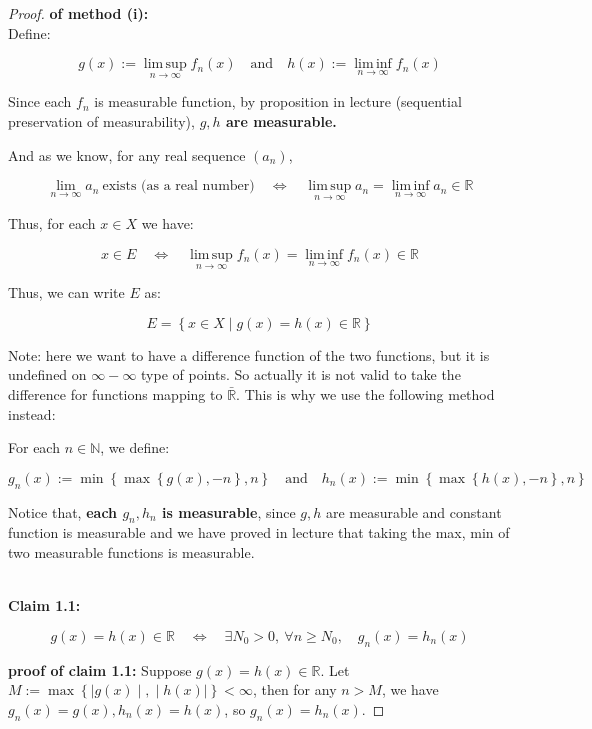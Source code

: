 \documentclass{qlnotes-export}
\begin{document}
\begin{proof}

\textbf{of method (i):}\\
Define:

\[g(x) := \operatorname{lim\, sup}\limits_{n\rightarrow\infty}f_{n}(x)\quad\text{and}\quad h(x) := \operatorname{lim\, inf}\limits_{n\rightarrow\infty}f_{n}(x)\]

Since each \(f_{n}\) is measurable function, by proposition in lecture (sequential preservation of measurability), \textbf{\(g,h\) are measurable.}

And as we know, for any real sequence \((a_{n})\),

\[\lim\limits_{n\rightarrow\infty}a_{n}\ \text{exists (as a real number)}\quad\Leftrightarrow\quad\operatorname{lim\, sup}\limits_{n\rightarrow\infty}a_{n} = \operatorname{lim\, inf}\limits_{n\rightarrow\infty}a_{n} \in {\mathbb{R}}\]

Thus, for each \(x \in X\) we have:

\[x \in E\quad\Leftrightarrow\quad\operatorname{lim\, sup}\limits_{n\rightarrow\infty}f_{n}(x) = \operatorname{lim\, inf}\limits_{n\rightarrow\infty}f_{n}(x) \in {\mathbb{R}}\]

Thus, we can write \(E\) as:

\[E = \left\{ {x \in X \mid g(x) = h(x) \in {\mathbb{R}}} \right\}\]

Note: here we want to have a difference function of the two functions, but it is undefined on \(\infty - \infty\) type of points. So actually it is not valid to take the difference for functions mapping to \(\bar{\mathbb{R}}\). This is why we use the following method instead:

For each \(n \in {\mathbb{N}}\), we define:

\[g_{n}(x) := \min\left\{ {\max\left\{ {g(x), - n} \right\},n} \right\}\quad\text{and}\quad h_{n}(x) := \min\left\{ {\max\left\{ {h(x), - n} \right\},n} \right\}\]

Notice that, \textbf{each \(g_{n},h_{n}\) is measurable}, since \(g,h\) are measurable and constant function is measurable and we have proved in lecture that taking the max, min of two measurable functions is measurable.\\
\strut \\
\textbf{Claim 1.1:}

\[g(x) = h(x) \in {\mathbb{R}}\quad\Leftrightarrow\quad\exists N_{0} > 0,\ \forall n \geq N_{0},\quad g_{n}(x) = h_{n}(x)\]

\textbf{proof of claim 1.1:} Suppose \(g(x) = h(x) \in {\mathbb{R}}\). Let \(M := \max\left\{ |g(x) \middle| , \middle| h(x)| \right\} < \infty\), then for any \(n > M\), we have \(g_{n}(x) = g(x),h_{n}(x) = h(x)\), so \(g_{n}(x) = h_{n}(x)\).


\end{proof}
\end{document}
